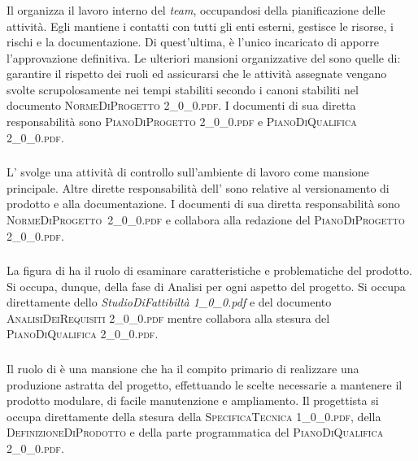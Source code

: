 		\subsubsection{\RdP}
		Il \textit{\RdP} organizza il lavoro interno del \textit{team}, occupandosi della pianificazione delle attività. Egli mantiene i contatti con tutti gli enti esterni, gestisce le risorse, i rischi e la documentazione. Di quest'ultima, è l'unico incaricato di apporre l'approvazione definitiva. Le ulteriori mansioni organizzative del \textit{\RdP} sono quelle di: garantire il rispetto dei ruoli ed assicurarsi che le attività assegnate vengano svolte scrupolosamente nei tempi stabiliti secondo i canoni stabiliti nel documento \textsc{NormeDiProgetto 2\_0\_0.pdf}. I documenti di sua diretta responsabilità sono \textsc{PianoDiProgetto 2\_0\_0.pdf} e \textsc{PianoDiQualifica 2\_0\_0.pdf}.

		\subsubsection{\Amm}
		L'\textit{\Amm} svolge una attività di controllo sull'ambiente di lavoro come mansione principale. Altre dirette responsabilità dell'\textit{\Amm} sono relative al versionamento di prodotto e alla documentazione. I documenti di sua diretta responsabilità sono \hbox{\textsc{NormeDiProgetto 2\_0\_0.pdf}} e collabora alla redazione del \textsc{PianoDiProgetto 2\_0\_0.pdf}.
		
		\subsubsection{\Ana}
		La figura di \textit{\Ana} ha il ruolo di esaminare caratteristiche e problematiche del prodotto. Si occupa, dunque, della fase di Analisi per ogni aspetto del progetto. Si occupa direttamente dello \textit{StudioDiFattibiltà 1\_0\_0.pdf} e del documento \textsc{AnalisiDeiRequisiti 2\_0\_0.pdf} mentre collabora alla stesura del \textsc{PianoDiQualifica 2\_0\_0.pdf}.

		\subsubsection{\Prog}
		Il ruolo di \textit{\Prog} è una mansione che ha il compito primario di realizzare una produzione astratta del progetto, effettuando le scelte necessarie a mantenere il prodotto modulare, di facile manutenzione e ampliamento. Il progettista si occupa direttamente della stesura della \textsc{SpecificaTecnica 1\_0\_0.pdf}, della \textsc{DefinizioneDiProdotto} e della parte programmatica del \textsc{PianoDiQualifica 2\_0\_0.pdf}.
		
